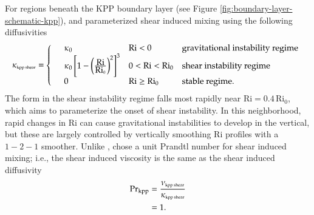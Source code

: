 For regions beneath the KPP boundary layer (see Figure
\ref{fig:boundary-layer-schematic-kpp}), \cite{LargeKPP} and
\cite{Large_Gent1999} parameterized shear induced mixing using the
following diffusivities
\begin{equation}
  \kappa_{\mbox{\tiny kpp shear}}= \left\{
\begin{array}{llll}
&\kappa_{0}  &\mbox{Ri} < 0  &\mbox{gravitational instability regime} 
 \\
   &\kappa_{0} \left[1- \left(\frac{\mbox{Ri}}{\mbox{Ri}_0}\right)^2 \right]^3
   &0 < \mbox{Ri}  <  \mbox{Ri}_0   &\mbox{shear instability regime}
\\
 &0 &\mbox{Ri} \ge \mbox{Ri}_{0} &\mbox{stable regime.} 
\end{array}
 \right.
\label{eq:kappa-shear-kpp}
\end{equation}
The form in the shear instability regime falls most rapidly near
$\mbox{Ri} = 0.4 \, \mbox{Ri}_{0}$, which aims to parameterize the
onset of shear instability. In this neighborhood, rapid changes in
$\mbox{Ri}$ can cause gravitational instabilities to develop in the
vertical, but these are largely controlled by vertically smoothing
$\mbox{Ri}$ profiles with a $1-2-1$ smoother.  Unlike \cite{PPvmix},
\cite{LargeKPP} chose a unit Prandtl number for shear induced mixing;
i.e., the shear induced viscosity is the same as the shear induced
diffusivity
\begin{subequations}
\begin{align}
  \mbox{Pr}_{\mbox{\scriptsize kpp}} &= \frac{\nu_{\mbox{\tiny kpp shear}}}{\kappa_{\mbox{\tiny kpp  shear}}} 
 \\
 &= 1.
\end{align}
\end{subequations}

